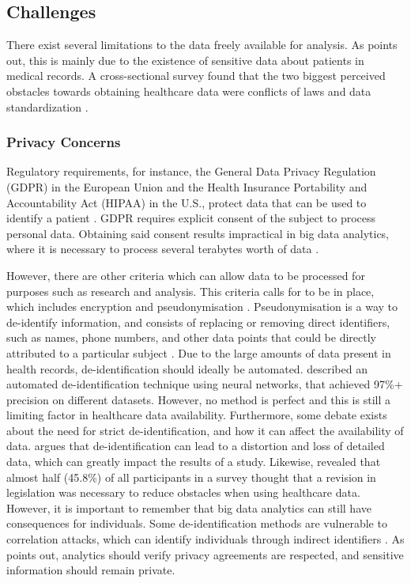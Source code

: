 \documentclass[a4paper,12pt]{article}
\begin{document}
\subsection{Challenges}

There exist several limitations to the data freely available for analysis.
As \textcite[2]{Dalianis2015} points out, this is mainly due to the existence of sensitive data about patients in medical records.
A cross-sectional survey found that the two biggest perceived obstacles towards obtaining healthcare data were conflicts of laws and data standardization \parencite{Kim2019}.

\subsubsection{Privacy Concerns}

Regulatory requirements, for instance, the General Data Privacy Regulation (GDPR) in the European Union and the Health Insurance Portability and Accountability Act (HIPAA) in the U.S., protect data that can be used to identify a patient \parencite{Iyengar2018}.
GDPR requires explicit consent of the subject to process personal data. Obtaining said consent results impractical in big data analytics, where it is necessary to process several terabytes worth of data \parencite{Hintze2018}.

However, there are other criteria which can allow data to be processed for purposes such as research and analysis.
This criteria calls for  to be in place, which includes encryption and pseudonymisation \parencite[151]{Hintze2018}.
Pseudonymisation is a way to de-identify information, and consists of replacing or removing direct identifiers, such as names, phone numbers, and other data points that could be directly attributed to a particular subject \parencite[146-147]{Hintze2018}.
Due to the large amounts of data present in health records, de-identification should ideally be automated.
\textcite{Dernoncourt2016} described an automated de-identification technique using neural networks, that achieved 97\%+ precision on different datasets.
However, no method is perfect and this is still a limiting factor in healthcare data availability.
Furthermore, some debate exists about the need for strict de-identification, and how it can affect the availability of data.
\textcite[2]{Shin2018} argues that de-identification can lead to a distortion and loss of detailed data, which can greatly impact the results of a study.
Likewise, \textcite{Kim2019} revealed that almost half (45.8\%) of all participants in a survey thought that a revision in legislation was necessary to reduce obstacles when using healthcare data.
However, it is important to remember that big data analytics can still have consequences for individuals.
Some de-identification methods are vulnerable to correlation attacks, which can identify individuals through indirect identifiers \parencite{Abouelmehdi2018}.
As \textcite{Abouelmehdi2018} points out, analytics should verify privacy agreements are respected, and sensitive information should remain private.
\end{document}
